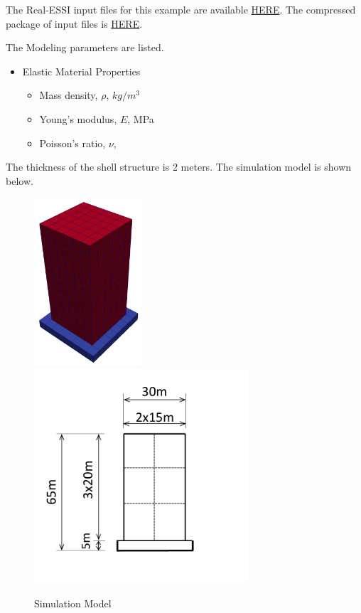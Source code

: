 The Real-ESSI input files for this example are available 
\href{https://github.com/yuan-energy/Real-ESSI-Short-Course-Examples/tree/master/short-course-examples/nonlinear_analysis_steps/structure/imposed_motion}{HERE}. 
The compressed package of input files is  
\href{https://github.com/yuan-energy/Real-ESSI-Short-Course-Examples/tree/master/short-course-examples/nonlinear_analysis_steps/structure/imposed_motion/imposed_motion.tgz?raw=true}{HERE}. 

The Modeling parameters are listed.
\begin{itemize}
  \item Elastic Material Properties 
  \begin{itemize}
    \item Mass density, $\rho$, \enspace {} $kg/m^3$
    \item Young's modulus, $E$, \enspace {} MPa
    \item Poisson's ratio, $\nu$, \enspace {}
  \end{itemize}
\end{itemize}


The thickness of the shell structure is 2 meters.
The simulation model is shown below.
\begin{figure}[H]
  \centering
  \includegraphics[width = 4cm]{./Figure-files/nonlinear_analysis_steps/structure/imposed_motion/structure-only.png}
  \hspace{2cm}
  \includegraphics[width = 8cm]{./Figure-files/nonlinear_analysis_steps/structure/eigen/structure_geometry.pdf}
  \caption{Simulation Model}
  \label{fig_simulate_model}
\end{figure}


